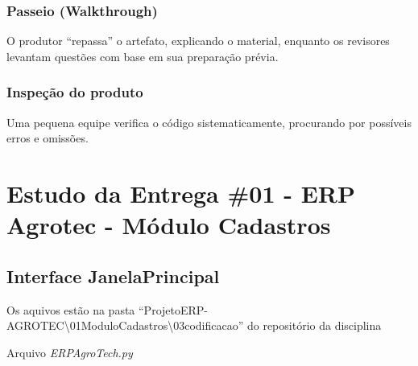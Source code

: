 \documentclass[
]{book}
\begin{document}
\subsection{Passeio (Walkthrough)}\label{passeio-walkthrough}

O produtor ``repassa'' o artefato, explicando o material, enquanto os revisores levantam questões com base em sua preparação prévia.

\subsection{Inspeção do produto}\label{inspeuxe7uxe3o-do-produto}

Uma pequena equipe verifica o código sistematicamente, procurando por possíveis erros e omissões.

\chapter{Estudo da Entrega \#01 - ERP Agrotec - Módulo Cadastros}\label{estudo-da-entrega-01---erp-agrotec---muxf3dulo-cadastros}

\section{Interface JanelaPrincipal}\label{interface-janelaprincipal}

Os aquivos estão na pasta ``ProjetoERP-AGROTEC\textbackslash01ModuloCadastros\textbackslash03codificacao\source'' do repositório da disciplina

Arquivo \emph{ERPAgroTech.py}
\end{document}

